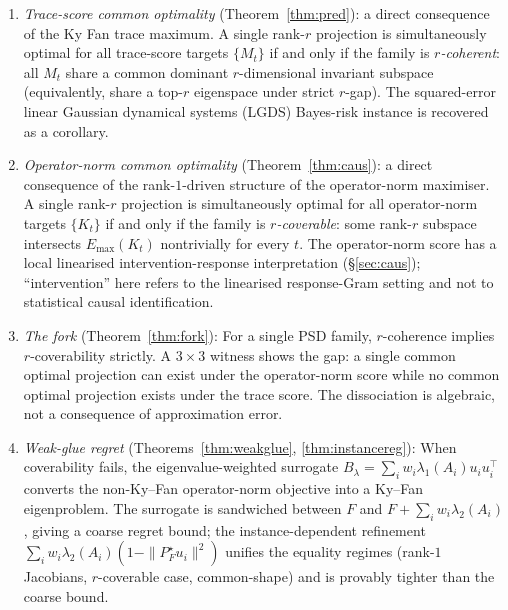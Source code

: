 \documentclass[final,3p,times]{elsarticle}
\newcommand{\Emax}{E_{\max}}
\begin{document}
\begin{enumerate}
\item \emph{Trace-score common optimality} (Theorem~\ref{thm:pred}):
a direct consequence of the Ky Fan trace maximum.
A single rank-$r$ projection is simultaneously optimal for all
trace-score targets $\{M_t\}$ if and only if the family is
\emph{$r$-coherent}: all $M_t$ share a common dominant $r$-dimensional
invariant subspace (equivalently, share a top-$r$ eigenspace under
strict $r$-gap).
The squared-error linear Gaussian dynamical systems (LGDS) Bayes-risk
instance is recovered as a corollary.

\item \emph{Operator-norm common optimality} (Theorem~\ref{thm:caus}):
a direct consequence of the rank-$1$-driven structure of the
operator-norm maximiser.
A single rank-$r$ projection is simultaneously optimal for all
operator-norm targets $\{K_t\}$ if and only if the family is
\emph{$r$-coverable}: some rank-$r$ subspace intersects $\Emax(K_t)$
nontrivially for every $t$.
The operator-norm score has a local linearised intervention-response
interpretation (\S\ref{sec:caus}); ``intervention'' here refers to the
linearised response-Gram setting and not to statistical causal
identification.

\item \emph{The fork} (Theorem~\ref{thm:fork}): For a single PSD family,
$r$-coherence implies $r$-coverability strictly.
A $3\times 3$ witness shows the gap: a single common optimal projection
can exist under the operator-norm score while no common optimal
projection exists under the trace score.
The dissociation is algebraic, not a consequence of approximation error.

\item \emph{Weak-glue regret} (Theorems~\ref{thm:weakglue},
\ref{thm:instancereg}): When coverability fails, the
eigenvalue-weighted surrogate
$B_\lambda = \sum_i w_i \lambda_1(A_i) u_i u_i^\top$ converts the
non-Ky--Fan operator-norm objective into a Ky--Fan eigenproblem.
The surrogate is sandwiched between $F$ and $F + \sum_i w_i\lambda_2(A_i)$,
giving a coarse regret bound; the instance-dependent refinement
$\sum_i w_i \lambda_2(A_i)(1-\|P_F^\star u_i\|^2)$ unifies the
equality regimes (rank-$1$ Jacobians, $r$-coverable case, common-shape)
and is provably tighter than the coarse bound.
\end{enumerate}
\end{document}
